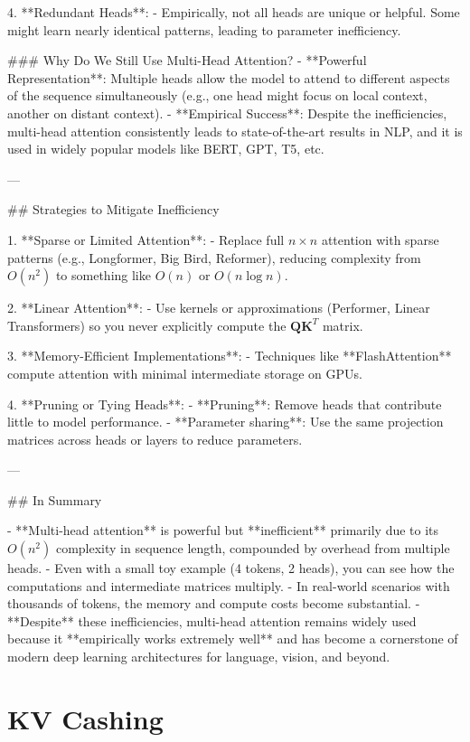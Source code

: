 4. **Redundant Heads**:  
   - Empirically, not all heads are unique or helpful. Some might learn nearly identical patterns, leading to parameter inefficiency.  

### Why Do We Still Use Multi-Head Attention?
- **Powerful Representation**: Multiple heads allow the model to attend to different aspects of the sequence simultaneously (e.g., one head might focus on local context, another on distant context).  
- **Empirical Success**: Despite the inefficiencies, multi-head attention consistently leads to state-of-the-art results in NLP, and it is used in widely popular models like BERT, GPT, T5, etc.  

---

## Strategies to Mitigate Inefficiency

1. **Sparse or Limited Attention**:  
   - Replace full \(n \times n\) attention with sparse patterns (e.g., Longformer, Big Bird, Reformer), reducing complexity from \(O(n^2)\) to something like \(O(n)\) or \(O(n \log n)\).

2. **Linear Attention**:  
   - Use kernels or approximations (Performer, Linear Transformers) so you never explicitly compute the \(\mathbf{Q}\mathbf{K}^T\) matrix.

3. **Memory-Efficient Implementations**:  
   - Techniques like **FlashAttention** compute attention with minimal intermediate storage on GPUs.

4. **Pruning or Tying Heads**:  
   - **Pruning**: Remove heads that contribute little to model performance.  
   - **Parameter sharing**: Use the same projection matrices across heads or layers to reduce parameters.

---

## In Summary

- **Multi-head attention** is powerful but **inefficient** primarily due to its \(O(n^2)\) complexity in sequence length, compounded by overhead from multiple heads.  
- Even with a small toy example (4 tokens, 2 heads), you can see how the computations and intermediate matrices multiply.  
- In real-world scenarios with thousands of tokens, the memory and compute costs become substantial.  
- **Despite** these inefficiencies, multi-head attention remains widely used because it **empirically works extremely well** and has become a cornerstone of modern deep learning architectures for language, vision, and beyond.


\section{KV Cashing}
\label{sec:transformer:kv_caching}

